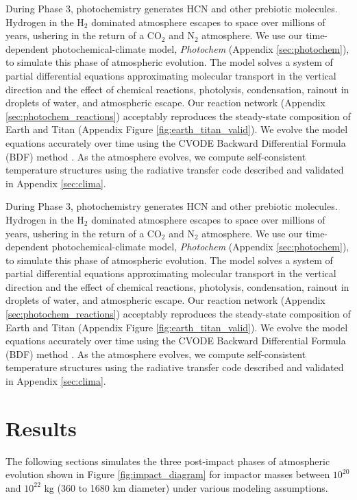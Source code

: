 During Phase 3, photochemistry generates HCN and other prebiotic molecules. Hydrogen in the H$_2$ dominated atmosphere escapes to space over millions of years, ushering in the return of a CO$_2$ and N$_2$ atmosphere. We use our time-dependent photochemical-climate model, \emph{Photochem} (Appendix \ref{sec:photochem}), to simulate this phase of atmospheric evolution. The model solves a system of partial differential equations approximating molecular transport in the vertical direction and the effect of chemical reactions, photolysis, condensation, rainout in droplets of water, and atmospheric escape. Our reaction network (Appendix \ref{sec:photochem_reactions}) acceptably reproduces the steady-state composition of Earth and Titan (Appendix Figure \ref{fig:earth_titan_valid}). We evolve the model equations accurately over time using the CVODE Backward Differential Formula (BDF) method \citep{Hindmarsh_2005}. As the atmosphere evolves, we compute self-consistent temperature structures using the radiative transfer code described and validated in Appendix \ref{sec:clima}.


During Phase 3, photochemistry generates HCN and other prebiotic molecules. Hydrogen in the H$_2$ dominated atmosphere escapes to space over millions of years, ushering in the return of a CO$_2$ and N$_2$ atmosphere. We use our time-dependent photochemical-climate model, \emph{Photochem} (Appendix \ref{sec:photochem}), to simulate this phase of atmospheric evolution. The model solves a system of partial differential equations approximating molecular transport in the vertical direction and the effect of chemical reactions, photolysis, condensation, rainout in droplets of water, and atmospheric escape. Our reaction network (Appendix \ref{sec:photochem_reactions}) acceptably reproduces the steady-state composition of Earth and Titan (Appendix Figure \ref{fig:earth_titan_valid}). We evolve the model equations accurately over time using the CVODE Backward Differential Formula (BDF) method \citep{Hindmarsh_2005}. As the atmosphere evolves, we compute self-consistent temperature structures using the radiative transfer code described and validated in Appendix \ref{sec:clima}.

\section{Results}

The following sections simulates the three post-impact phases of atmospheric evolution shown in Figure \ref{fig:impact_diagram} for impactor masses between $10^{20}$ and $10^{22}$ kg (360 to 1680 km diameter) under various modeling assumptions.

